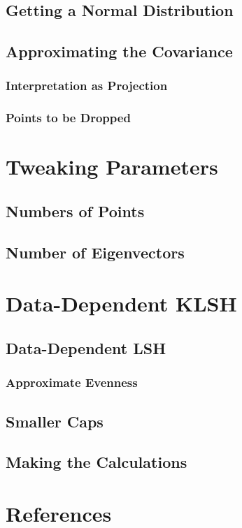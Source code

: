 \documentclass[twoside,11pt]{homework}
\begin{document}
\subsection{Getting a Normal Distribution} %

\subsection{Approximating the Covariance} %

\subsubsection{Interpretation as Projection} %

\subsubsection{Points to be Dropped} %

\section{Tweaking Parameters} %

\subsection{Numbers of Points}

\subsection{Number of Eigenvectors}

\section{Data-Dependent KLSH} %

\subsection{Data-Dependent LSH}

\subsubsection{Approximate Evenness}

\subsection{Smaller Caps}

\subsection{Making the Calculations}

\section{References}
\end{document}
